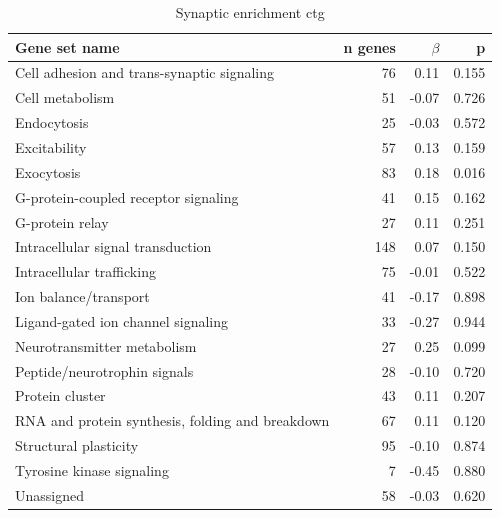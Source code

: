 \begin{table}[ht]
\centering
\begin{tabular}{lrrr}
  \toprule 
Gene set name & n genes & $\beta$ & p\\
  \midrule
Cell adhesion and trans-synaptic signaling & 76 & 0.11 & 0.155 \\ 
  Cell metabolism & 51 & -0.07 & 0.726 \\ 
  Endocytosis & 25 & -0.03 & 0.572 \\ 
  Excitability & 57 & 0.13 & 0.159 \\ 
  Exocytosis & 83 & 0.18 & 0.016 \\ 
  G-protein-coupled receptor signaling & 41 & 0.15 & 0.162 \\ 
  G-protein relay & 27 & 0.11 & 0.251 \\ 
  Intracellular signal transduction & 148 & 0.07 & 0.150 \\ 
  Intracellular trafficking & 75 & -0.01 & 0.522 \\ 
  Ion balance/transport & 41 & -0.17 & 0.898 \\ 
  Ligand-gated ion channel signaling & 33 & -0.27 & 0.944 \\ 
  Neurotransmitter metabolism & 27 & 0.25 & 0.099 \\ 
  Peptide/neurotrophin signals & 28 & -0.10 & 0.720 \\ 
  Protein cluster & 43 & 0.11 & 0.207 \\ 
  RNA and protein synthesis, folding and breakdown & 67 & 0.11 & 0.120 \\ 
  Structural plasticity & 95 & -0.10 & 0.874 \\ 
  Tyrosine kinase signaling & 7 & -0.45 & 0.880 \\ 
  Unassigned & 58 & -0.03 & 0.620 \\ 
   \bottomrule
\end{tabular}
\caption{Synaptic enrichment ctg} 
\label{tab:MAGMA enrichment of synaptic groups ctg}
\end{table}

